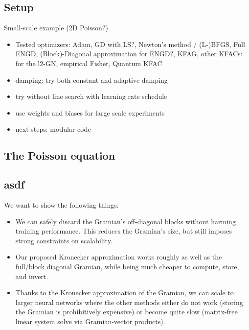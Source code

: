 \subsection{Setup}

Small-scale example (2D Poisson?)
\begin{itemize}
    \item Tested optimizers: Adam, GD with LS?, Newton's method / (L-)BFGS, Full ENGD, (Block)-Diagonal approximation for ENGD?, KFAG, other KFACs: for the l2-GN, empirical Fisher, Quantum KFAC
    \item damping: try both constant and adaptive damping
    \item try without line search with learning rate schedule
\end{itemize}

\begin{itemize}
    \item use weights and biases for large scale experiments
    \item next steps: modular code
\end{itemize}

\subsection{The Poisson equation}

\subsection{asdf}

We want to show the following things:
\begin{itemize}
\item We can safely discard the Gramian's off-diagonal blocks without harming
  training performance. This reduces the Gramian's size, but still imposes
  strong constraints on scalability.

\item Our proposed Kronecker approximation works roughly as well as the
  full/block diagonal Gramian, while being much cheaper to compute, store, and
  invert.

\item Thanks to the Kronecker approximation of the Gramian, we can scale to larger neural networks where the other methods either do not work (storing the Gramian is prohibitively expensive) or become quite slow (matrix-free linear system solve via Gramian-vector products).
\end{itemize}

